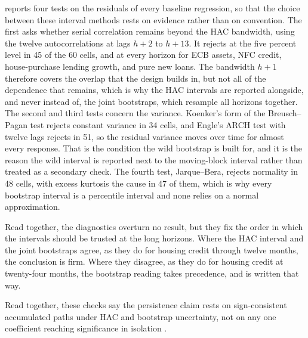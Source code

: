  reports four tests on the residuals of every baseline regression, so that the choice between these interval methods rests on evidence rather than on convention. The first asks whether serial correlation remains beyond the HAC bandwidth, using the twelve autocorrelations at lags \(h+2\) to \(h+13\). It rejects at the five percent level in 45 of the 60 cells, and at every horizon for ECB assets, NFC credit, house-purchase lending growth, and pure new loans. The bandwidth \(h+1\) therefore covers the overlap that the design builds in, but not all of the dependence that remains, which is why the HAC intervals are reported alongside, and never instead of, the joint bootstraps, which resample all horizons together. The second and third tests concern the variance. Koenker's form of the Breusch--Pagan test rejects constant variance in 34 cells, and Engle's ARCH test with twelve lags rejects in 51, so the residual variance moves over time for almost every response. That is the condition the wild bootstrap is built for, and it is the reason the wild interval is reported next to the moving-block interval rather than treated as a secondary check. The fourth test, Jarque--Bera, rejects normality in 48 cells, with excess kurtosis the cause in 47 of them, which is why every bootstrap interval is a percentile interval and none relies on a normal approximation.



Read together, the diagnostics overturn no result, but they fix the order in which the intervals should be trusted at the long horizons. Where the HAC interval and the joint bootstraps agree, as they do for housing credit through twelve months, the conclusion is firm. Where they disagree, as they do for housing credit at twenty-four months, the bootstrap reading takes precedence, and  is written that way.



Read together, these checks say the persistence claim rests on sign-consistent accumulated paths under HAC and bootstrap uncertainty, not on any one coefficient reaching significance in isolation \parencite{Jorda2005,NeweyWest1987}.

